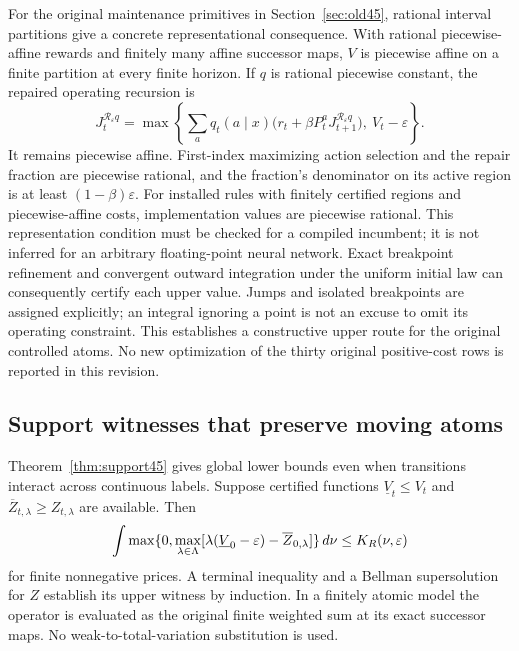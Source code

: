 For the original maintenance primitives in Section~\ref{sec:old45}, rational interval partitions give a concrete representational consequence. With rational piecewise-affine rewards and finitely many affine successor maps, $V$ is piecewise affine on a finite partition at every finite horizon. If $q$ is rational piecewise constant, the repaired operating recursion is
\begin{equation}\label{eq:projection45}
 J_t^{\mathcal R_\varepsilon q}=
 \max\left\{\sum_a q_t(a\mid x)\big(r_t+\beta P_t^aJ_{t+1}^{\mathcal R_\varepsilon q}\big),\ V_t-\varepsilon\right\}.
\end{equation}
It remains piecewise affine. First-index maximizing action selection and the repair fraction are piecewise rational, and the fraction's denominator on its active region is at least $(1-\beta)\varepsilon$. For installed rules with finitely certified regions and piecewise-affine costs, implementation values are piecewise rational. This representation condition must be checked for a compiled incumbent; it is not inferred for an arbitrary floating-point neural network. Exact breakpoint refinement and convergent outward integration under the uniform initial law can consequently certify each upper value. Jumps and isolated breakpoints are assigned explicitly; an integral ignoring a point is not an excuse to omit its operating constraint. This establishes a constructive upper route for the original controlled atoms. No new optimization of the thirty original positive-cost rows is reported in this revision.

\subsection{Support witnesses that preserve moving atoms}\label{sec:atomicwitness45}
Theorem~\ref{thm:support45} gives global lower bounds even when transitions interact across continuous labels. Suppose certified functions $\underline V_t\le V_t$ and $\overline Z_{t,\lambda}\ge Z_{t,\lambda}$ are available. Then
\begin{equation}\label{eq:witnesslower45}
 \int\max\{0,\max_{\lambda\in\Lambda}
       [\lambda(\underline V_0-\varepsilon)-\overline Z_{0,\lambda}]\}\,d\nu
 \le K_R(\nu,\varepsilon)
\end{equation}
for finite nonnegative prices. A terminal inequality and a Bellman supersolution for $Z$ establish its upper witness by induction. In a finitely atomic model the operator is evaluated as the original finite weighted sum at its exact successor maps. No weak-to-total-variation substitution is used.

